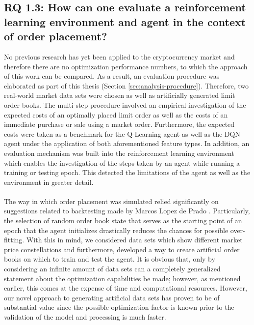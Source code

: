 \subsection{RQ 1.3: How can one evaluate a reinforcement learning environment and agent in the context of order placement?}

    No previous research has  yet been applied to the cryptocurrency market and therefore there are no optimization performance numbers, to which the approach of this work can be compared. As a result, an evaluation procedure was elaborated as part of this thesis (Section \ref{sec:analysis-procedure}).
    Therefore, two real-world market data sets were chosen as well as artificially generated limit order books.
    The multi-step procedure involved an empirical investigation of the expected costs of an optimally placed limit order as well as the costs of an immediate purchase or sale using a market order.
    Furthermore, the expected costs were taken as a benchmark for the Q-Learning agent as well as the DQN agent under the application of both aforementioned feature types.
    In addition, an evaluation mechanism was built into the reinforcement learning environment which enables the investigation of the steps taken by an agent while running a training or testing epoch.
    This detected the limitations of the agent as well as the environment in greater detail.
    \\
    \\
    The way in which order placement was simulated relied significantly on suggestions related to backtesting made by Marcos Lopez de Prado \cite{de2018advances}.
    Particularly, the selection of random order book state that serves as the starting point of an epoch that the agent initializes drastically reduces the chances for possible over-fitting.
    With this in mind, we considered data sets which show different market price constellations and furthermore, developed a way to create artificial order books on which to train and test the agent.
    It is obvious that, only by considering an infinite amount of data sets can a completely generalized statement about the optimization capabilities be made; however, as mentioned earlier, this comes at the expense of time and computational resources.
    However, our novel approach to generating artificial data sets has proven to be of substantial value since the possible optimization factor is known prior to the validation of the model and processing is much faster.
    
